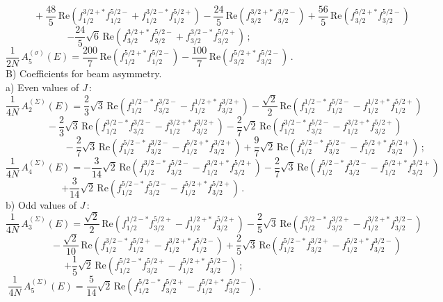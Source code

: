 \documentclass[prc,reprint,onecolumn,amsmath,amssymb,superscriptaddress]{revtex4-1}
\begin{document}
$$
	~~~~~~~~~~~~~+\frac{48}5\,\mathrm{Re}\left(f_{1/2}^{3/2+*}f_{1/2}^{5/2-}+f_{1/2}^{3/2-*}f_{1/2}^{5/2+}\right)
	-\frac{24}{5}\,\mathrm{Re}\left(f_{3/2}^{3/2+*}f_{3/2}^{3/2-}\right)
	+\frac{56}{5}\,\mathrm{Re}\left(f_{3/2}^{5/2+*}f_{3/2}^{5/2-}\right)$$
$$
	-\frac{24}5 \sqrt{6}\,\mathrm{Re}\left(f_{3/2}^{3/2+*}f_{3/2}^{5/2-}+f_{3/2}^{3/2-*}f_{3/2}^{5/2+}\right)\,;
	~~~~~~~~~~~~~~~~~~~~
$$
$$
	\frac1{2N}\,A^{(\sigma)}_5(E)= \frac{200}{7}\,\mathrm{Re}\left(f_{1/2}^{5/2+*}f_{1/2}^{5/2-}\right)
	- \frac{100}{7}\,\mathrm{Re}\left(f_{3/2}^{5/2+*}f_{3/2}^{5/2-}\right)\,.
	~~~~~~~~~~~~~~~~~~~~~~~~~~~~~~~~~~~~~
$$
B) Coefficients for beam asymmetry.\\
a) Even values of $J\,$:\\
$$ 
	\frac1{4N}\,A^{(\Sigma)}_2(E)=
	\frac23\sqrt{3}\,\mathrm{Re}\left(f_{1/2}^{1/2-*}f_{3/2}^{3/2-}-f_{1/2}^{1/2+*}f_{3/2}^{3/2+}\right)
	-\frac{\sqrt{2}}2\,\mathrm{Re}\left(f_{1/2}^{1/2-*}f_{1/2}^{5/2-}-f_{1/2}^{1/2+*}f_{1/2}^{5/2+}\right)
$$
$$
	~~~~~~~~~~~~~~~~~~~ -\frac23\sqrt{3}\,\mathrm{Re}\left(f_{1/2}^{3/2-*}f_{3/2}^{3/2-}
	-f_{1/2}^{3/2+*}f_{3/2}^{3/2+}\right)
	-\frac27\sqrt{2}\,\mathrm{Re}\left(f_{1/2}^{3/2-*}f_{3/2}^{5/2-}-f_{1/2}^{3/2+*}f_{3/2}^{5/2+}\right)
$$
$$
	~~~~~~~~~~~~~~~~~~~~~~~~~~~ -\frac27\sqrt{3}\,\mathrm{Re}\left(f_{1/2}^{5/2-*}f_{3/2}^{3/2-}
	-f_{1/2}^{5/2+*}f_{3/2}^{3/2+}\right)
	+\frac97\sqrt{2}\,\mathrm{Re}\left(f_{1/2}^{5/2-*}f_{3/2}^{5/2-}-f_{1/2}^{5/2+*}f_{3/2}^{5/2+}\right)\,;
$$
$$ 
	\frac1{4N}\,A^{(\Sigma)}_4(E)=-\frac3{14}\sqrt{2}\,\mathrm{Re}\left(f_{1/2}^{3/2-*}f_{3/2}^{5/2-}
	-f_{1/2}^{3/2+*}f_{3/2}^{5/2+}\right)
	-\frac27\sqrt{3}\,\mathrm{Re}\left(f_{1/2}^{5/2-*}f_{3/2}^{3/2-}-f_{1/2}^{5/2+*}f_{3/2}^{3/2+}\right)
$$
$$
	+\frac3{14}\sqrt{2}\,\mathrm{Re}\left(f_{1/2}^{5/2-*}f_{3/2}^{5/2-}
	-f_{1/2}^{5/2+*}f_{3/2}^{5/2+}\right)\,.~~~~~~~~~~~~~~~~~~~~~~~~~~ 
$$
b) Odd values of $J\,$:
$$
	\frac1{4N}\,A^{(\Sigma)}_3(E)= \frac{\sqrt{2}}2\,\mathrm{Re}\left(f_{1/2}^{1/2-*}f_{3/2}^{5/2+}-f_{1/2}^{1/2+*}f_{3/2}^{5/2+}\right)
	-\frac25\sqrt{3}\,\mathrm{Re}\left(f_{1/2}^{3/2-*}f_{3/2}^{3/2+}-f_{1/2}^{3/2+*}f_{3/2}^{3/2-}\right)
$$
$$
	~~~~~~~~~~~~~~~~~~~~~ -\frac{\sqrt{2}}{10}\,\mathrm{Re}\left(f_{1/2}^{3/2-*}f_{1/2}^{5/2+}
	-f_{1/2}^{3/2+*}f_{1/2}^{5/2-}\right)
	+\frac25\sqrt{3}\,\mathrm{Re}\left(f_{1/2}^{5/2-*}f_{3/2}^{3/2+}-f_{1/2}^{5/2+*}f_{3/2}^{3/2-}\right)
$$
$$
	+\frac15\sqrt{2}\,\mathrm{Re}\left(f_{1/2}^{5/2-*}f_{3/2}^{5/2+}-f_{1/2}^{5/2+*}f_{3/2}^{5/2-}\right)\,;
	~~~~~~~~~~~~~~~~~~~~~~~~~
$$
$$
	\frac1{4N}\,A^{(\Sigma)}_5(E)=\frac5{14}\sqrt{2}\,\mathrm{Re}\left(f_{1/2}^{5/2-*}f_{3/2}^{5/2+}
	-f_{1/2}^{5/2+*}f_{3/2}^{5/2-}\right)\,.~~~~~~~~~~~~~~~~~~~~~~~~~~~~~~~~~~~~~~~~~~~
$$
\end{document}
